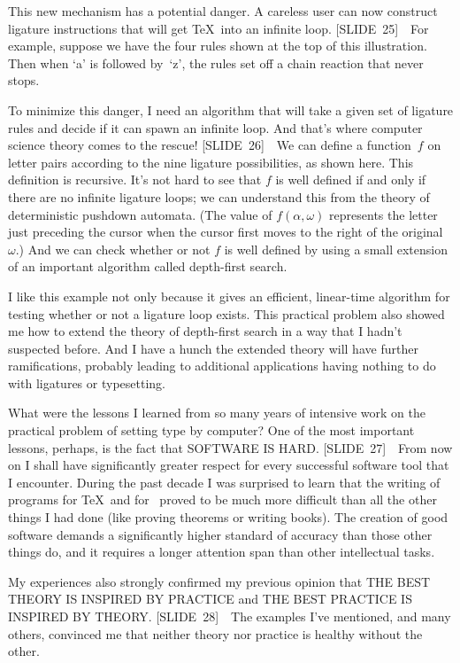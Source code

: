 This new mechanism has a potential danger. A careless user can now
construct ligature instructions that will get \TeX\ into an infinite
loop. [SLIDE~25]\ \ For example, suppose we have the four rules shown
at the top of this illustration. Then when `a' is followed by~`z', the
rules set off a chain reaction that never stops.

To minimize this danger, I need an algorithm that will take a given
set of ligature rules and decide if it can spawn an infinite loop. And
that's where computer science theory comes to the rescue! [SLIDE~26]\
\ We can define a function~$f$ on letter pairs according to the nine
ligature possibilities, as shown here. This definition is recursive.
It's not hard to see that $f$ is well defined if and only if there are
no infinite ligature loops; we can understand this from the theory of
deterministic pushdown automata. (The value of $f(\alpha,\omega)$
represents the letter just preceding the cursor when the  cursor first
moves to the right of the original~$\omega$.) And we can check whether
or not $f$ is well defined by using a small extension of an important
algorithm called depth-first search.

I like this example not only because it gives an efficient,
linear-time algorithm for testing whether or not a ligature loop
exists. This practical problem also showed me how to extend the theory
of depth-first search in a way that I hadn't suspected before. And I
have a hunch the extended theory will have further ramifications,
probably leading to additional applications having nothing to do with
ligatures or typesetting.

What were the lessons I learned from so many years of intensive work
on the practical problem of setting type by computer? One of the most
important lessons, perhaps, is the fact that SOFTWARE IS HARD.
[SLIDE~27]\ \ From now on I shall have significantly greater respect
for every successful software tool that I encounter. During the past
decade I was surprised to learn that the writing of programs for \TeX\
and for \MF\ proved to be much more difficult than all the other
things I had done (like proving theorems or writing books). The
creation of good software demands a significantly higher standard of
accuracy than those other things do, and it requires a longer
attention span than other intellectual tasks.

My experiences also strongly confirmed my previous opinion that THE
BEST THEORY IS INSPIRED BY PRACTICE and THE BEST PRACTICE IS INSPIRED
BY THEORY. [SLIDE~28]\ \ The examples I've mentioned, and many others,
convinced me that neither theory nor practice is healthy without the
other.


